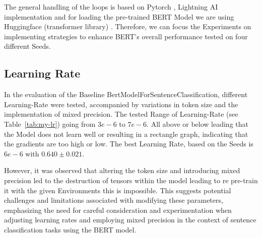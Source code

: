 \vspace{0.3cm}

The general handling of the loops is based on Pytorch \cite{noauthor_pytorch_nodate}, Lightning AI \cite{noauthor_lightning_nodate}
implementation and for loading the pre-trained BERT Model we are using Huggingface (transformer library) \cite{noauthor_hugging_2023}.
Therefore, we can focus the Experiments on implementing strategies to enhance BERT's overall performance tested on four different Seeds.











\subsection{Learning Rate}

In the evaluation of the Baseline BertModelForSentenceClassification, different Learning-Rate 
were tested, accompanied by variations in token size and the implementation of mixed precision.
The tested Range of Learning-Rate (see Table~\ref{tab:my-lr}) going from $3e-6$ to $7e-6$. All above or
below leading that the Model does not learn well or resulting in a rectangle graph, indicating
that the gradients are too high or low. The best Learning Rate, based on the Seeds is $6e-6$ with
$0.640 \pm 0.021$.

However, it was observed that altering the token size and introducing mixed precision led to 
the destruction of tensors within the model leading to re pre-train it with the given Environments
this is impossible. 
This suggests potential challenges and limitations associated with modifying these parameters, 
emphasizing the need for careful consideration and experimentation when adjusting 
learning rates and employing mixed precision in the context of sentence classification 
tasks using the BERT model.

